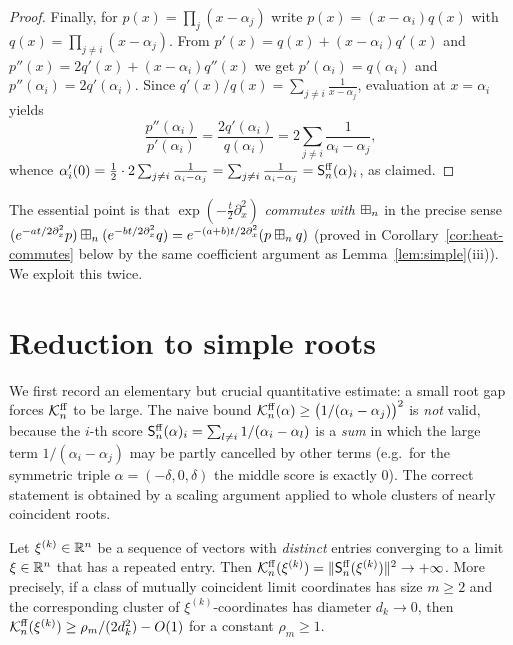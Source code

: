 \begin{proof}
Finally, for $p(x)=\prod_j(x-\alpha_j)$ write $p(x)=(x-\alpha_i)q(x)$ with
$q(x)=\prod_{j\ne i}(x-\alpha_j)$. From $p'(x)=q(x)+(x-\alpha_i)q'(x)$ and
$p''(x)=2q'(x)+(x-\alpha_i)q''(x)$ we get $p'(\alpha_i)=q(\alpha_i)$ and
$p''(\alpha_i)=2q'(\alpha_i)$. Since
$q'(x)/q(x)=\sum_{j\ne i}\tfrac1{x-\alpha_j}$, evaluation at $x=\alpha_i$ yields
\[
\frac{p''(\alpha_i)}{p'(\alpha_i)}=\frac{2q'(\alpha_i)}{q(\alpha_i)}
=2\sum_{j\ne i}\frac{1}{\alpha_i-\alpha_j},
\]
whence $\alpha_i'(0)=\tfrac12\cdot2\sum_{j\ne i}\tfrac1{\alpha_i-\alpha_j}
=\sum_{j\ne i}\tfrac1{\alpha_i-\alpha_j}=\mathsf{S}^{\mathrm{ff}}_n(\alpha)_i$, as claimed.
\end{proof}

The essential point is that $\exp(-\tfrac t2\partial_x^2)$ \emph{commutes with}
$\boxplus_n$ in the precise sense
$(e^{-at/2\partial_x^2}p)\boxplus_n(e^{-bt/2\partial_x^2}q)=e^{-(a+b)t/2\partial_x^2}(p\boxplus_n q)$
(proved in Corollary~\ref{cor:heat-commutes} below by the same coefficient
argument as Lemma~\ref{lem:simple}(iii)). We exploit this twice.

\section*{Reduction to simple roots}

We first record an elementary but crucial quantitative estimate: a small root
gap forces $\mathcal{K}^{\mathrm{ff}}_n$ to be large. The naive bound
$\mathcal{K}^{\mathrm{ff}}_n(\alpha)\ge\bigl(1/(\alpha_i-\alpha_j)\bigr)^2$ is \emph{not} valid,
because the $i$-th score $\mathsf{S}^{\mathrm{ff}}_n(\alpha)_i=\sum_{l\ne i}1/(\alpha_i-\alpha_l)$
is a \emph{sum} in which the large term $1/(\alpha_i-\alpha_j)$ may be partly
cancelled by other terms (e.g.\ for the symmetric triple
$\alpha=(-\delta,0,\delta)$ the middle score is exactly $0$). The correct
statement is obtained by a scaling argument applied to whole clusters of nearly
coincident roots.

\begin{qfourlemma}\label{lem:gapblowup}
Let $\xi^{(k)}\in\mathbb{R}^n$ be a sequence of vectors with \emph{distinct} entries
converging to a limit $\xi\in\mathbb{R}^n$ that has a repeated entry. Then
$\mathcal{K}^{\mathrm{ff}}_n(\xi^{(k)})=\|\mathsf{S}^{\mathrm{ff}}_n(\xi^{(k)})\|^2\to+\infty$. More precisely,
if a class of mutually coincident limit coordinates has size $m\ge2$ and the
corresponding cluster of $\xi^{(k)}$-coordinates has diameter $d_k\to0$, then
$\mathcal{K}^{\mathrm{ff}}_n(\xi^{(k)})\ge \rho_m/(2d_k^2)-O(1)$ for a constant $\rho_m\ge1$.
\end{qfourlemma}

